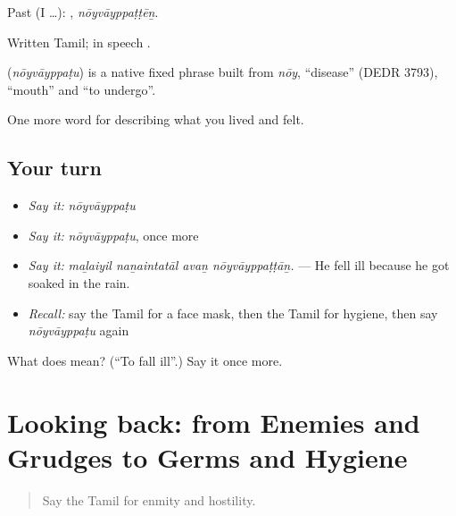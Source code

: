 Past (I …): , \emph{nōyvāyppaṭṭēṉ}.

Written Tamil; in speech  .

\begin{cousinweb}
\textbf{} (\emph{nōyvāyppaṭu}) is a native fixed phrase built from  \emph{nōy}, \textquotedblleft{}disease\textquotedblright{} (DEDR 3793),  \textquotedblleft{}mouth\textquotedblright{} and  \textquotedblleft{}to undergo\textquotedblright{}.
\end{cousinweb}

\begin{grammarlens}[title={What you've built}]
One more word for describing what you lived and felt.
\end{grammarlens}

\subsection*{Your turn}
\begin{itemize}
\raggedright
  \item \emph{Say it:} \emph{nōyvāyppaṭu}
  \item \emph{Say it:} \emph{nōyvāyppaṭu}, once more
  \item \emph{Say it:} \emph{maḻaiyil naṉaintatāl avaṉ nōyvāyppaṭṭāṉ.} — He fell ill because he got soaked in the rain.
  \item \emph{Recall:} say the Tamil for a face mask, then the Tamil for hygiene, then say \emph{nōyvāyppaṭu} again
\end{itemize}

\begin{tcolorbox}[breakable,colback=teal!4,colframe=teal!35!black,title={Before you move on}]
What does  mean? (\textquotedblleft{}To fall ill\textquotedblright{}.) Say it once more.
\end{tcolorbox}
\section[(dialogue)]{Looking back: from Enemies and Grudges to Germs and Hygiene}

\label{lesson:TA-R476-review-469-476}



\begin{quote}
Say the Tamil for enmity and hostility.
\end{quote}


